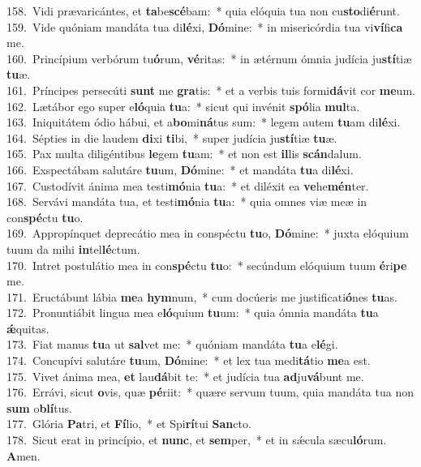 {158.~}Vidi prævaricántes, et \textbf{ta}be\textbf{scé}bam:~* quia elóquia tua non cu\textbf{sto}di\textbf{é}runt.\\
{159.~}Vide quóniam mandáta tua di\textbf{lé}xi, \textbf{Dó}mine:~* in misericórdia tua vi\textbf{ví}fi\textbf{ca} me.\\
{160.~}Princípium verbórum tu\textbf{ó}rum, \textbf{vé}ritas:~* in ætérnum ómnia judícia ju\textbf{stí}tiæ \textbf{tu}æ.\\
{161.~}Príncipes persecúti \textbf{sunt} me \textbf{gra}tis:~* et a verbis tuis formi\textbf{dá}vit cor \textbf{me}um.\\
{162.~}Lætábor ego super e\textbf{ló}quia \textbf{tu}a:~* sicut qui invénit \textbf{spó}lia \textbf{mul}ta.\\
{163.~}Iniquitátem ódio hábui, et a\textbf{bo}mi\textbf{ná}tus sum:~* legem autem \textbf{tu}am di\textbf{lé}xi.\\
{164.~}Sépties in die laudem \textbf{di}xi \textbf{ti}bi,~* super judícia ju\textbf{stí}tiæ \textbf{tu}æ.\\
{165.~}Pax multa diligéntibus \textbf{le}gem \textbf{tu}am:~* et non est \textbf{il}lis \textbf{scán}dalum.\\
{166.~}Exspectábam salutáre \textbf{tu}um, \textbf{Dó}mine:~* et mandáta \textbf{tu}a di\textbf{lé}xi.\\
{167.~}Custodívit ánima mea testi\textbf{mó}nia \textbf{tu}a:~* et diléxit ea \textbf{ve}he\textbf{mén}ter.\\
{168.~}Servávi mandáta tua, et testi\textbf{mó}nia \textbf{tu}a:~* quia omnes viæ meæ in con\textbf{spé}ctu \textbf{tu}o.\\
{169.~}Appropínquet deprecátio mea in conspéctu \textbf{tu}o, \textbf{Dó}mine:~* juxta elóquium tuum da mihi \textbf{in}tel\textbf{lé}ctum.\\
{170.~}Intret postulátio mea in con\textbf{spé}ctu \textbf{tu}o:~* secúndum elóquium tuum \textbf{é}ri\textbf{pe} me.\\
{171.~}Eructábunt lábia \textbf{me}a \textbf{hym}num,~* cum docúeris me justificati\textbf{ó}nes \textbf{tu}as.\\
{172.~}Pronuntiábit lingua mea e\textbf{ló}quium \textbf{tu}um:~* quia ómnia mandáta \textbf{tu}a \textbf{ǽ}quitas.\\
{173.~}Fiat manus \textbf{tu}a ut \textbf{sal}vet me:~* quóniam mandáta \textbf{tu}a e\textbf{lé}gi.\\
{174.~}Concupívi salutáre \textbf{tu}um, \textbf{Dó}mine:~* et lex tua medi\textbf{tá}tio \textbf{me}a est.\\
{175.~}Vivet ánima mea, \textbf{et} lau\textbf{dá}bit te:~* et judícia tua \textbf{ad}ju\textbf{vá}bunt me.\\
{176.~}Errávi, sicut \textbf{o}vis, quæ \textbf{pé}riit:~* quære servum tuum, quia mandáta tua non \textbf{sum} o\textbf{blí}tus.\\
{177.~}Glória \textbf{Pa}tri, et \textbf{Fí}lio,~* et Spi\textbf{rí}tui \textbf{San}cto.\\
{178.~}Sicut erat in princípio, et \textbf{nunc}, et \textbf{sem}per,~* et in sǽcula sæcu\textbf{ló}rum. \textbf{A}men.\\
